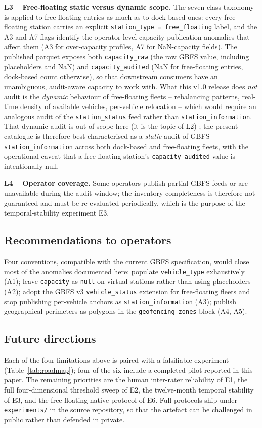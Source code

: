 \documentclass[11pt,a4paper]{article}
\begin{document}
\textbf{L3 -- Free-floating static versus dynamic scope.}
The seven-class taxonomy is applied to free-floating entries as
much as to dock-based ones: every free-floating station carries
an explicit \texttt{station\_type = free\_floating} label, and the
A3 and A7 flags identify the operator-level capacity-publication
anomalies that affect them (A3 for over-capacity profiles, A7 for
NaN-capacity fields). The published parquet exposes both
\texttt{capacity\_raw} (the raw GBFS value, including placeholders
and NaN) and \texttt{capacity\_audited} (NaN for free-floating
entries, dock-based count otherwise), so that downstream consumers
have an unambiguous, audit-aware capacity to work with. What this
v1.0 release does \emph{not} audit is the \emph{dynamic} behaviour
of free-floating fleets -- rebalancing patterns, real-time density
of available vehicles, per-vehicle relocation -- which would
require an analogous audit of the \texttt{station\_status} feed
rather than \texttt{station\_information}. That dynamic audit is
out of scope here (it is the topic of L2) ; the present catalogue
is therefore best characterised as a \emph{static} audit of GBFS
\texttt{station\_information} across both dock-based and
free-floating fleets, with the operational caveat that a
free-floating station's \texttt{capacity\_audited} value is
intentionally null.

\textbf{L4 -- Operator coverage.} Some operators publish partial GBFS
feeds or are unavailable during the audit window; the inventory
completeness is therefore not guaranteed and must be re-evaluated
periodically, which is the purpose of the temporal-stability
experiment E3.

\subsection{Recommendations to operators}
Four conventions, compatible with the current GBFS specification,
would close most of the anomalies documented here: populate
\texttt{vehicle\_type} exhaustively (A1); leave \texttt{capacity}
as \texttt{null} on virtual stations rather than using placeholders
(A2); adopt the GBFS v3 \texttt{vehicle\_status} extension for
free-floating fleets and stop publishing per-vehicle anchors as
\texttt{station\_information} (A3); publish geographical perimeters
as polygons in the \texttt{geofencing\_zones} block (A4, A5).

\subsection{Future directions}
Each of the four limitations above is paired with a falsifiable
experiment (Table~\ref{tab:roadmap}); four of the six include a
completed pilot reported in this paper. The remaining priorities are
the human inter-rater reliability of E1, the full four-dimensional
threshold sweep of E2, the twelve-month temporal stability of E3,
and the free-floating-native protocol of E6. Full protocols ship
under \texttt{experiments/} in the source repository, so that the
artefact can be challenged in public rather than defended in
private.
\end{document}
